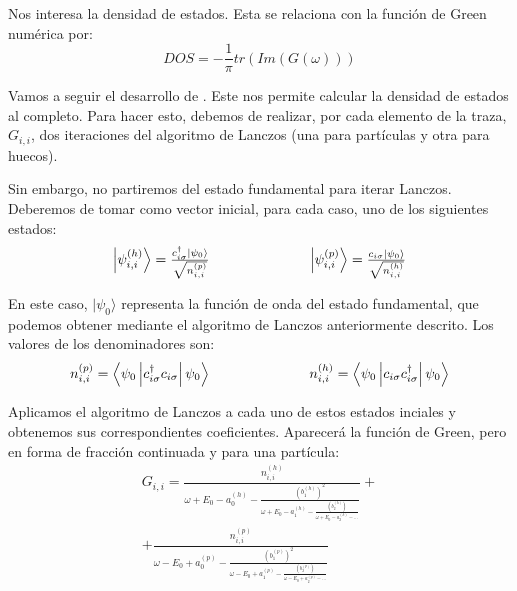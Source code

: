 \documentclass[12pt,twoside]{article}
\begin{document}
Nos interesa la densidad de estados. Esta se relaciona con la función de Green numérica por:
\begin{equation}
  DOS = -\frac{1}{\pi}tr\left(Im\left(G(\omega)\right)\right)
\end{equation}

Vamos a seguir el desarrollo de \cite{GreeneDiniz2024}. Este nos permite calcular la densidad de estados al completo. Para hacer esto, debemos de realizar, por cada elemento de la traza, $G_{i,i}$, dos iteraciones del algoritmo de Lanczos (una para partículas y otra para huecos).

Sin embargo, no partiremos del estado fundamental para iterar Lanczos. Deberemos de tomar como vector inicial, para cada caso, uno de los siguientes estados:
\begin{equation}
  \begin{array}{ccc}
    \left|\psi_{i, i}^{(h)}\right\rangle = \frac{c_{i\sigma}^{\dagger}\left|\psi_0\right\rangle}{\sqrt{n_{i, i}^{(p)}}} & \hspace{0.15\linewidth} & \left|\psi_{i, i}^{(p)}\right\rangle = \frac{c_{i\sigma}\left|\psi_0\right\rangle}{\sqrt{n_{i, i}^{(h)}}}
  \end{array}
\end{equation}

En este caso, $|\psi_0\rangle$ representa la función de onda del estado fundamental, que podemos obtener mediante el algoritmo de Lanczos anteriormente descrito. Los valores de los denominadores son:
\begin{equation}
  \begin{array}{ccc}
    n_{i, i}^{(p)} = \left\langle\psi_0\left| c_{i\sigma}^{\dagger}c_{i\sigma}\right|\psi_0\right\rangle & \hspace{0.15\linewidth} & n_{i, i}^{(h)} = \left\langle\psi_0\left| c_{i\sigma}c_{i\sigma}^{\dagger}\right|\psi_0\right\rangle
  \end{array}
\end{equation}

Aplicamos el algoritmo de Lanczos a cada uno de estos estados inciales y obtenemos sus correspondientes coeficientes. Aparecerá la función de Green, pero en forma de fracción continuada y para una partícula:
\begin{equation}
  \begin{split}
    G_{i, i} = \frac{n_{i, i}^{(h)}}{\omega + E_0 - a_0^{(h)} - \frac{\left(b_1^{(h)}\right)^2}{\omega + E_0 - a_1^{(h)} - \frac{\left(b_2^{(h)}\right)}{\omega + E_0 - a_2^{(h)} - \ldots}}} + \\ + \frac{n_{i, i}^{(p)}}{\omega - E_0 + a_0^{(p)} - \frac{\left(b_1^{(p)}\right)^2}{\omega - E_0 + a_1^{(p)} - \frac{\left(b_2^{(p)}\right)}{\omega - E_0 + a_2^{(p)} - \ldots}}}
  \end{split}
  \label{eq:greenLanczos}
\end{equation}
\end{document}
